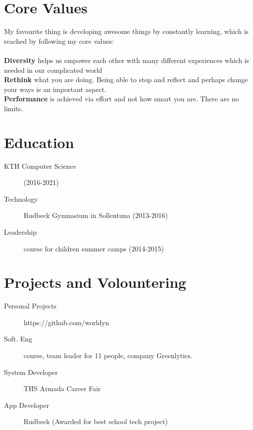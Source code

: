 \documentclass[margin,line,a4paper]{resume}
\begin{document}
\begin{resume}
\section{\mysidestyle Core Values}\vspace{1mm}
    My favourite thing is developing awesome things by constantly learning, which is reached by following my core values: 
    \\
    \\
    \textbf{Diversity} helps us empower each other with many different experiences which is needed in our complicated world
    \\
    \textbf{Rethink} what you are doing. Being able to stop and reflect and perhaps change your ways is an important aspect.
    \\
    \textbf{Performance} is achieved via effort and not how smart you are. There are no limits.

\section{\mysidestyle Education}\vspace{1mm}
    \begin{description}
        \item[KTH Computer Science] (2016-2021)
        \item[Technology] Rudbeck Gymnasium in Sollentuna (2013-2016)
        \item[Leadership] course for children summer camps (2014-2015)
    \end{description} 

\section{\mysidestyle Projects and Volountering}\vspace{1mm}
\begin{description}
    \item[Personal Projects] https://github.com/worldyn
    \item[Soft. Eng] course, team leader for 11 people, company Greenlytics.   
     \item[System Developer] THS Armada Career Fair
    \item[App Developer] Rudbeck (Awarded for best school tech project) 

\end{description}  
  

\end{resume}
\end{document}

